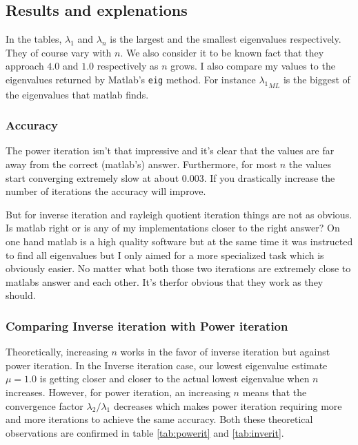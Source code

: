 \documentclass[a4paper,11pt]{article}
\begin{document}
\subsection{Results and explenations}


In the tables, $\lambda_1$ and $\lambda_n$ is the largest and the
smallest eigenvalues respectively. They of course vary with $n$. We also
consider it to be known fact that they approach $4.0$ and $1.0$
respectively as $n$ grows. I also compare my values to the eigenvalues
returned by Matlab's \texttt{eig} method. For instance
${\lambda_1}_{ML}$ is the biggest of the eigenvalues that matlab finds.

\subsubsection{Accuracy}

The power iteration isn't that impressive and it's clear that the values
are far away from the correct (matlab's) answer. Furthermore, for most
$n$ the values start converging extremely slow at about $0.003$. If you
drastically increase the number of iterations the accuracy will improve.

But for inverse iteration and rayleigh quotient iteration things are not
as obvious. Is matlab right or is any of my implementations closer to
the right answer? On one hand matlab is a high quality software but at
the same time it was instructed to find all eigenvalues but I only aimed
for a more specialized task which is obviously easier. No matter what
both those two iterations are extremely close to matlabs answer and each
other. It's therfor obvious that they work as they should.

\subsubsection{Comparing Inverse iteration with Power iteration}

Theoretically, increasing $n$ works in the favor of inverse
iteration but against power iteration. In the Inverse iteration
case, our lowest eigenvalue estimate $\mu=1.0$ is getting closer and
closer to the actual lowest eigenvalue when $n$ increases. However, for
power iteration, an increasing $n$ means that the convergence factor
$\lambda_2/\lambda_1$ decreases which makes power iteration requiring
more and more iterations to achieve the same accuracy. Both these
theoretical observations are confirmed in table \ref{tab:powerit}
and \ref{tab:inverit}.
\end{document}
